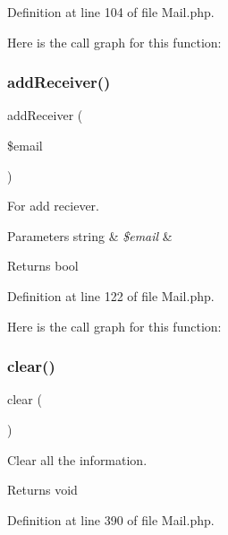 Definition at line 104 of file Mail.\+php.

Here is the call graph for this function\+:
\mbox{\label{class_zest_1_1_mail_1_1_mail_a31cd1494886ccd0d0734bfc229f95d9f}} 
\subsubsection{\texorpdfstring{add\+Receiver()}{addReceiver()}}
{\footnotesize\ttfamily add\+Receiver (\begin{DoxyParamCaption}\item[{}]{\$email }\end{DoxyParamCaption})}

For add reciever.


\begin{DoxyParams}[1]{Parameters}
string & {\em \$email} & \\
\hline
\end{DoxyParams}
\begin{DoxyReturn}{Returns}
bool 
\end{DoxyReturn}


Definition at line 122 of file Mail.\+php.

Here is the call graph for this function\+:
\mbox{\label{class_zest_1_1_mail_1_1_mail_aa821bec12eaa7e0f649397c9675ff505}} 
\subsubsection{\texorpdfstring{clear()}{clear()}}
{\footnotesize\ttfamily clear (\begin{DoxyParamCaption}{ }\end{DoxyParamCaption})}

Clear all the information.

\begin{DoxyReturn}{Returns}
void 
\end{DoxyReturn}


Definition at line 390 of file Mail.\+php.

\mbox{\label{class_zest_1_1_mail_1_1_mail_a746fee70ac0f3dcd5543ff033dabbc97}} 
